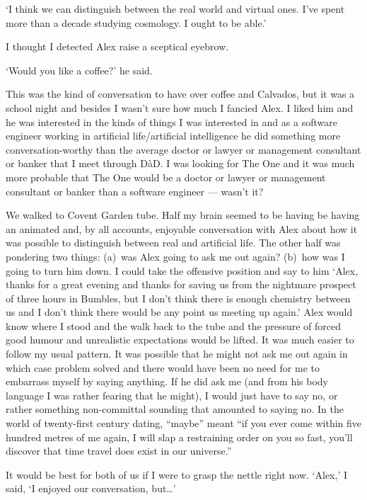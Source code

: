 `I think we can distinguish between the real world and virtual
ones. I've spent more than a decade studying cosmology. I ought to be able.'

I thought I detected Alex raise a sceptical eyebrow.

`Would you like a coffee?' he said.

This was the kind of conversation to have over coffee and
Calvados, but it was a school night and besides I wasn't sure how
much I fancied Alex. I liked him and he was interested
in the kinds of things I was interested in and as a software
engineer working in artificial
life/artificial intelligence he did something more conversation-worthy than
the average doctor or lawyer or management consultant or banker that I meet
through D{\`a}D. I was looking for The One and it was much more probable that The One would be a doctor or lawyer or management consultant or banker than a software engineer --- wasn't it?

We walked to Covent Garden tube. Half my brain seemed to be having
be having an animated and, by all accounts, enjoyable conversation
with Alex about how it was possible to distinguish between real and
artificial life. The other half was pondering two things: (a)~was
Alex going to ask me out again? (b)~how was I going to turn him
down. I could take the offensive position and say to him
`Alex, thanks for a great evening and thanks for saving us from the
nightmare prospect of three hours in Bumbles, but I don't think
there is enough chemistry between us and I don't think there would
be any point us meeting up again.' Alex would know where I stood and
the walk back to the tube and the pressure of forced good humour and
unrealistic expectations would be lifted. It was much easier to follow my usual
pattern. It was possible that
he might not ask me out again in which case problem solved and there
would have been no need for me to embarrass myself by saying
anything. If he did ask me (and from his body language I was rather
fearing that he might), I would just have to say no, or rather
something non-committal sounding that amounted to saying no. In the world of
twenty-first century dating, ``maybe'' meant ``if you ever come
within five hundred metres of me again, I will slap a restraining
order on you so fast, you'll discover that time travel does exist in
our universe.''

It would be best for both of us if I were to grasp the nettle right now. `Alex,' I said, `I enjoyed our conversation, but\dots'

